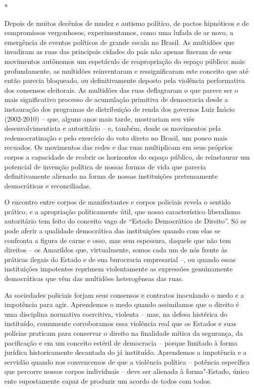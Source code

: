 *

Depois de muitos decênios de mudez e autismo político, de pactos
hipnóticos e de compromissos vergonhosos, experimentamos, como uma
lufada de ar novo, a emergência de eventos políticos de grande escala no
Brasil. As multidões que invadiram as ruas das principais cidades do
país não apenas fizeram de seus movimentos autônomos um espetáculo de
reapropriação do espaço público; mais profundamente, as multidões
reinventaram e ressignificaram este conceito que até então parecia
bloqueado, ou definitivamente deposto pela violência performativa dos
consensos eleitorais. As multidões das ruas deflagraram o que parece ser
o mais significativo processo de acumulação primitiva de democracia
desde a instauração dos programas de distribuição de renda dos governos
Luiz Inácio (2002-2010) -- que, alguns anos mais tarde, mostrariam seu
viés desenvolvimentista e autoritário -- e, também, desde os movimentos
pela redemocratização e pelo exercício do voto direto no Brasil, um
pouco mais recuados. Os movimentos das redes e das ruas multiplicam em
seus próprios corpos a capacidade de reabrir os horizontes do espaço
público, de reinstaurar um potencial de invenção política de nossas
formas de vida que parecia definitivamente alienado na forma de nossas
instituições pretensamente democráticas e reconciliadas.

O encontro entre corpos de manifestantes e corpos policiais revela o
sentido prático, e a apropriação politicamente útil, que nosso
característico liberalismo autoritário tem feito do conceito vago de
``Estado Democrático de Direito''. Só se pode aferir a qualidade
democrática das instituições quando com elas se confronta a figura de
carne e osso, mas sem espessura, daquele que não tem direitos -- os
Amarildos que, virtualmente, somos cada um de nós frente às práticas
ilegais do Estado e de sua burocracia empresarial --, ou quando essas
instituições impotentes reprimem violentamente as expressões
genuinamente democráticas que vêm das multidões heterogêneas das ruas.

As sociedades policiais forjam seus consensos e contratos inoculando o
medo e a impotência para agir. Aprendemos o medo quando assimilamos que
o direito é uma disciplina normativa coercitiva, violenta -- mas, na
defesa histérica do instituído, comumente corroboramos essa violência
real que os Estados e suas polícias praticam para conservar o direito na
finalidade mítica da segurança, da pacificação e em um conceito estéril
de democracia -- porque limitado à forma jurídica historicamente
decantada do já instituído. Aprendemos a impotência e a servidão quando
nos convencemos de que a violência política -- potência específica que
percorre nossos corpos individuais -- deve ser alienada à forma"-Estado,
único ente supostamente capaz de produzir um acordo de todos com todos.

